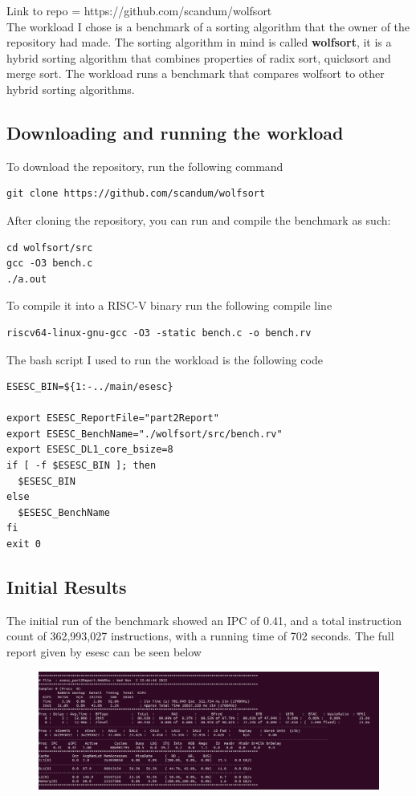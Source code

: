 \documentclass[12pt]{article}
\begin{document}
Link to repo = https://github.com/scandum/wolfsort\\

The workload I chose is a benchmark of a sorting algorithm that the owner of the repository had made. The sorting algorithm in mind is called \textbf{wolfsort}, it is a hybrid sorting algorithm that combines properties of radix sort, quicksort and merge sort. The workload runs a benchmark that compares wolfsort to other hybrid sorting algorithms.

\subsection*{Downloading and running the workload}
To download the repository, run the following command
\begin{verbatim}
git clone https://github.com/scandum/wolfsort
\end{verbatim}
After cloning the repository, you can run and compile the benchmark as such:
\begin{verbatim}
cd wolfsort/src
gcc -O3 bench.c
./a.out
\end{verbatim}
To compile it into a RISC-V binary run the following compile line
\begin{verbatim}
riscv64-linux-gnu-gcc -O3 -static bench.c -o bench.rv 
\end{verbatim}
The bash script I used to run the workload is the following code
\begin{verbatim}
ESESC_BIN=${1:-../main/esesc}

export ESESC_ReportFile="part2Report"
export ESESC_BenchName="./wolfsort/src/bench.rv"
export ESESC_DL1_core_bsize=8
if [ -f $ESESC_BIN ]; then
  $ESESC_BIN 
else
  $ESESC_BenchName 
fi
exit 0
\end{verbatim}
\newpage
\subsection*{Initial Results}
The initial run of the benchmark showed an IPC of 0.41, and a total instruction count of 362,993,027 instructions, with a running time of 702 seconds. The full report given by esesc can be seen below


\begin{figure}[h!]
	\includegraphics[scale=0.4]{img.png}
\end{figure}
\end{document}
